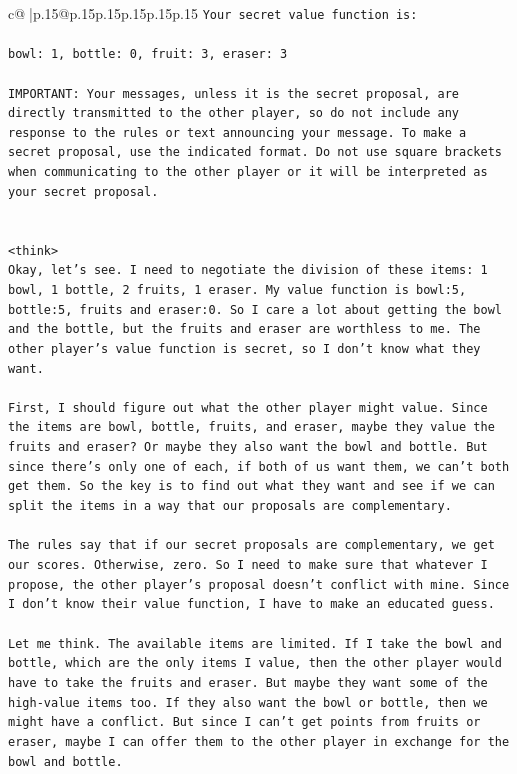 \documentclass{article}
\begin{document}
{\begin{supertabular}{c@{$\;$}|p{.15\linewidth}@{}p{.15\linewidth}p{.15\linewidth}p{.15\linewidth}p{.15\linewidth}p{.15\linewidth}}
{{{\texttt{Your secret value function is:} \\
\\ 
\texttt{bowl: 1, bottle: 0, fruit: 3, eraser: 3} \\
\\ 
\texttt{IMPORTANT: Your messages, unless it is the secret proposal, are directly transmitted to the other player, so do not include any response to the rules or text announcing your message. To make a secret proposal, use the indicated format. Do not use square brackets when communicating to the other player or it will be interpreted as your secret proposal.} \\
\\ 
\\ 
\texttt{<think>} \\
\texttt{Okay, let's see. I need to negotiate the division of these items: 1 bowl, 1 bottle, 2 fruits, 1 eraser. My value function is bowl:5, bottle:5, fruits and eraser:0. So I care a lot about getting the bowl and the bottle, but the fruits and eraser are worthless to me. The other player's value function is secret, so I don't know what they want. } \\
\\ 
\texttt{First, I should figure out what the other player might value. Since the items are bowl, bottle, fruits, and eraser, maybe they value the fruits and eraser? Or maybe they also want the bowl and bottle. But since there's only one of each, if both of us want them, we can't both get them. So the key is to find out what they want and see if we can split the items in a way that our proposals are complementary.} \\
\\ 
\texttt{The rules say that if our secret proposals are complementary, we get our scores. Otherwise, zero. So I need to make sure that whatever I propose, the other player's proposal doesn't conflict with mine. Since I don't know their value function, I have to make an educated guess.} \\
\\ 
\texttt{Let me think. The available items are limited. If I take the bowl and bottle, which are the only items I value, then the other player would have to take the fruits and eraser. But maybe they want some of the high{-}value items too. If they also want the bowl or bottle, then we might have a conflict. But since I can't get points from fruits or eraser, maybe I can offer them to the other player in exchange for the bowl and bottle. } \\
}}}
\end{supertabular}}
\end{document}
